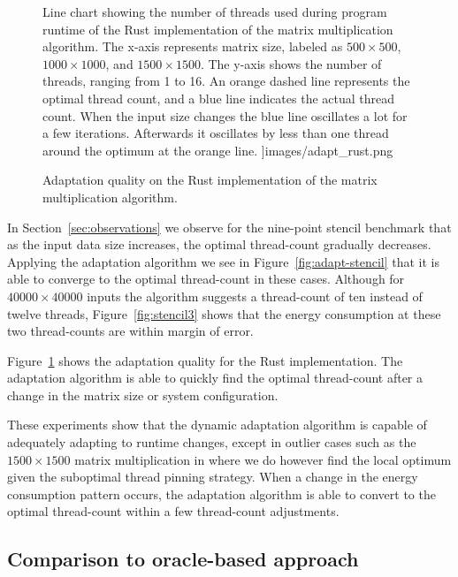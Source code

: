 \begin{figure}[t]
\begin{minipage}[c]{0.49\linewidth}
{            Line chart showing the number of threads used during program runtime of the Rust
            implementation of the matrix multiplication algorithm. The x-axis represents matrix
            size, labeled as $500 \times 500$, $1000 \times 1000$, and $1500 \times 1500$. The
            y-axis shows the number of threads, ranging from 1 to 16. An orange dashed line
            represents the optimal thread count, and a blue line indicates the actual thread count.
            When the input size changes the blue line oscillates a lot for a few iterations.
            Afterwards it oscillates by
            less than one thread around the optimum at the orange line.
        }]{images/adapt_rust.png}
        \caption{Adaptation quality on the Rust implementation of the matrix multiplication algorithm.}
        \label{fig:adapt-rust}
    \end{minipage}%
\end{figure}

In Section~\ref{sec:observations} we observe for the nine-point stencil benchmark that as the input
data size increases, the optimal thread-count gradually decreases. Applying the adaptation algorithm
we see in Figure~\ref{fig:adapt-stencil} that it is able to converge to the optimal thread-count in
these cases. Although for $40000 \times 40000$ inputs the algorithm suggests a thread-count of ten
instead of twelve threads, Figure~\ref{fig:stencil3} shows that the energy consumption at these two
thread-counts are within margin of error.

Figure~\ref{fig:adapt-rust} shows the adaptation quality for the Rust implementation. The adaptation
algorithm is able to quickly find the optimal thread-count after a change in the matrix size or
system configuration.

These experiments show that the dynamic adaptation algorithm is capable of adequately adapting to
runtime changes, except in outlier cases such as the $1500 \times 1500$ matrix multiplication in
\sac{} where we do however find the local optimum given the suboptimal thread pinning strategy. When
a change in the energy consumption pattern occurs, the adaptation algorithm is able to convert to
the optimal thread-count within a few thread-count adjustments.

\subsection{Comparison to oracle-based approach}\label{sec:evalation-oracle}

